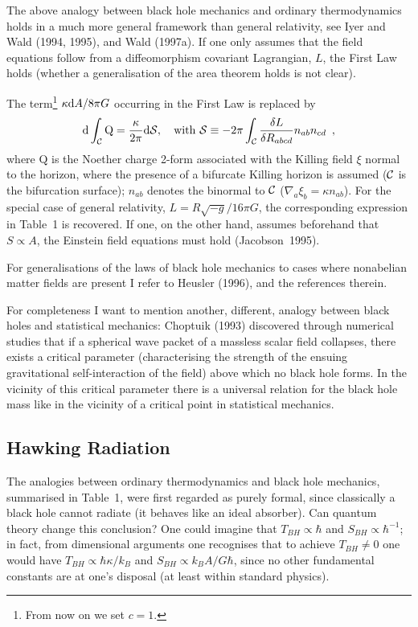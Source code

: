\documentclass[12pt]{article}
\def\D{{\rm d}}
\newcommand{\be}{\begin{equation}}
\newcommand{\ee}{\end{equation}}
\begin{document}
\vskip 2mm
\normalsize

The above analogy between black hole mechanics and
ordinary thermodynamics holds in a much more general framework
than general relativity,
see Iyer and Wald (1994, 1995), and Wald (1997a).
 If one only assumes that the field
equations follow from a diffeomorphism covariant Lagrangian, $L$,
the First Law holds (whether a generalisation
of the area theorem holds is not clear). 

\vskip 2mm
\small

The term\footnote{From now on we set $c=1$.}
 $\kappa \D A/8\pi G$ occurring in the First Law 
is replaced by
\be \D\int_{\cal C}\mbox{Q}=\frac{\kappa}{2\pi}\D{\cal S}, \quad
    \mbox{with } {\cal S}\equiv -2\pi\int_{\cal C}
     \frac{\delta L}{\delta R_{abcd}}n_{ab}n_{cd} \enspace, \ee
where $\mbox{Q}$ is the Noether charge 2-form associated with the
Killing field $\xi$ normal to the horizon, where the presence
of a bifurcate Killing horizon is assumed (${\cal C}$ is the
bifurcation surface); $n_{ab}$ denotes the binormal to
${\cal C}$ ($\nabla_a\xi_b=\kappa n_{ab}$). For the special case
of general relativity, $L=R\sqrt{-g}/16\pi G$, the corresponding
expression in Table~1 is recovered. If one, on the other hand,
assumes beforehand that $S\propto A$,
the Einstein field equations must hold (Jacobson~1995).

\vskip 2mm
\normalsize

For generalisations of the laws of black hole mechanics to
cases where nonabelian matter fields are present I refer
to Heusler (1996), and the references therein.

For completeness I want to mention another, different, analogy between
black holes and statistical mechanics: 
Choptuik (1993) discovered through numerical studies
 that if a spherical wave packet of a massless
scalar field collapses, there exists a critical parameter
(characterising the strength of the ensuing gravitational
self-interaction of the field)
above which no black hole forms. In the vicinity of this
critical parameter there is a universal relation for
the black hole mass like in the vicinity of a critical point
in statistical mechanics. 

\subsection{Hawking Radiation}

The analogies between ordinary thermodynamics and black hole
mechanics, summarised in Table~1, were first regarded as purely formal,
since classically a black hole cannot radiate
(it behaves like an ideal absorber). Can quantum theory
change this conclusion? One could imagine that $T_{BH}\propto\hbar$
and $S_{BH}\propto\hbar^{-1}$; in fact, from dimensional
arguments one recognises that to achieve $T_{BH}\neq0$ one would
have $T_{BH}\propto \hbar\kappa/k_B$ and $S_{BH}\propto k_BA/G\hbar$,
since no other fundamental constants are at one's disposal
(at least within standard physics). 
\end{document}
